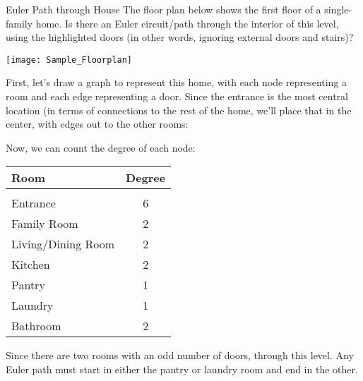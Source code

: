 \begin{example}{Euler Path through House}
The floor plan below shows the first floor of a single-family home.  Is there an Euler circuit/path through the interior of this level, using the highlighted doors (in other words, ignoring external doors and stairs)?
\begin{center}
\texttt{[image: Sample\_Floorplan]}
\end{center}

\sol
First, let's draw a graph to represent this home, with each node representing a room and each edge representing a door.  Since the entrance is the most central location (in terms of connections to the rest of the home, we'll place that in the center, with edges out to the other rooms:
\begin{center}
\end{center}

Now, we can count the degree of each node:
\begin{center}
\begin{tabular}{l c}
\textbf{Room} & \textbf{Degree}\\
\hline
& \\
Entrance & 6\\
Family Room & 2\\
Living/Dining Room & 2\\
Kitchen & 2\\
Pantry & 1\\
Laundry & 1\\
Bathroom & 2
\end{tabular}
\end{center}

Since there are two rooms with an odd number of doors,  through this level.  Any Euler path must start in either the pantry or laundry room and end in the other.
\end{example}
\pagebreak

